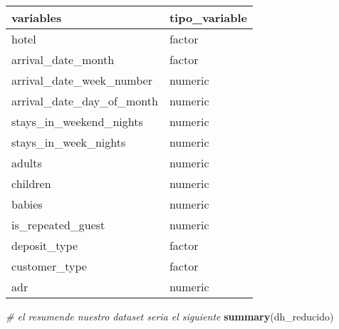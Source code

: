 \documentclass[]{article}
\newenvironment{Shaded}{\begin{snugshade}}{\end{snugshade}}
\newcommand{\CommentTok}[1]{\textcolor[rgb]{0.56,0.35,0.01}{\textit{#1}}}
\newcommand{\KeywordTok}[1]{\textcolor[rgb]{0.13,0.29,0.53}{\textbf{#1}}}
\newcommand{\NormalTok}[1]{#1}
\begin{document}
\begin{longtable}[]{@{}ll@{}}
\toprule
variables & tipo\_variable\tabularnewline
\midrule
\endhead
hotel & factor\tabularnewline
arrival\_date\_month & factor\tabularnewline
arrival\_date\_week\_number & numeric\tabularnewline
arrival\_date\_day\_of\_month & numeric\tabularnewline
stays\_in\_weekend\_nights & numeric\tabularnewline
stays\_in\_week\_nights & numeric\tabularnewline
adults & numeric\tabularnewline
children & numeric\tabularnewline
babies & numeric\tabularnewline
is\_repeated\_guest & numeric\tabularnewline
deposit\_type & factor\tabularnewline
customer\_type & factor\tabularnewline
adr & numeric\tabularnewline
\bottomrule
\end{longtable}

\begin{Shaded}
\begin{Highlighting}[]
\CommentTok{# el resumende nuestro dataset seria el siguiente }
\KeywordTok{summary}\NormalTok{(dh_reducido)}
\end{Highlighting}
\end{Shaded}
\end{document}
